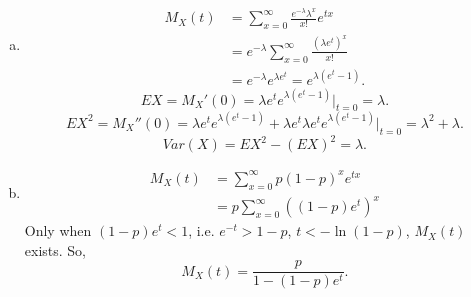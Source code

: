 \documentclass[14pt]{elegantbook}
\begin{document}
    \begin{solution}
        \begin{enumerate}[(a)]
            \item \begin{align*}
                M_X(t)&=\sum_{x=0}^\infty \frac{e^{-\lambda}\lambda^x}{x!}e^{tx}\\
                &=e^{-\lambda}\sum_{x=0}^\infty \frac{{(\lambda e^t)}^x}{x!}\\
                &=e^{-\lambda}e^{\lambda e^t}=e^{\lambda (e^t-1)}.
            \end{align*}
            \[EX=M_X'(0)=\lambda e^t e^{\lambda (e^t-1)}|_{t=0}=\lambda. \]
            \[EX^2=M_X''(0)=\lambda e^t e^{\lambda (e^t-1)}+\lambda e^t \lambda e^t e^{\lambda(e^t-1)}|_{t=0}=\lambda^2+\lambda. \]
            \[Var(X)=EX^2-(EX)^2=\lambda. \]
            \item \begin{align*}
                M_X(t)&=\sum_{x=0}^\infty p(1-p)^xe^{tx}\\
                &=p\sum_{x=0}^\infty ((1-p)e^t)^x
            \end{align*}
            Only when $(1-p)e^t<1$, i.e. $e^{-t}>1-p$, $t<-\ln(1-p)$, $M_X(t)$ exists. So, 
            \[M_X(t)=\frac{p}{1-(1-p)e^t}. \]


\end{enumerate}
\end{solution}
\end{document}

